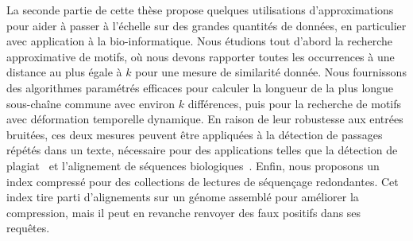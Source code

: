 La seconde partie de cette thèse propose quelques utilisations d'approximations pour aider à passer à l'échelle sur des grandes quantités de données, en particulier avec application à la bio-informatique.
%
Nous étudions tout d'abord la recherche approximative de motifs, où nous devons rapporter toutes les occurrences à une distance au plus égale à $k$ pour une mesure de similarité donnée.
Nous fournissons des algorithmes paramétrés efficaces pour calculer la longueur de la plus longue sous-chaîne commune avec environ $k$ différences, puis pour la recherche de motifs avec déformation temporelle dynamique. En raison de leur robustesse aux entrées bruitées, ces deux mesures peuvent être appliquées à la détection de passages répétés dans un texte, nécessaire pour des applications telles que la détection de plagiat~\cite{zou2010cluster} et l'alignement de séquences biologiques~\cite{leimeister2014kmacs,loose2016real,han2018accurate}.
Enfin, nous proposons un index compressé pour des collections de lectures de séquençage redondantes. Cet index tire parti d'alignements sur un génome assemblé pour améliorer la compression, mais il peut en revanche renvoyer des faux positifs dans ses requêtes.